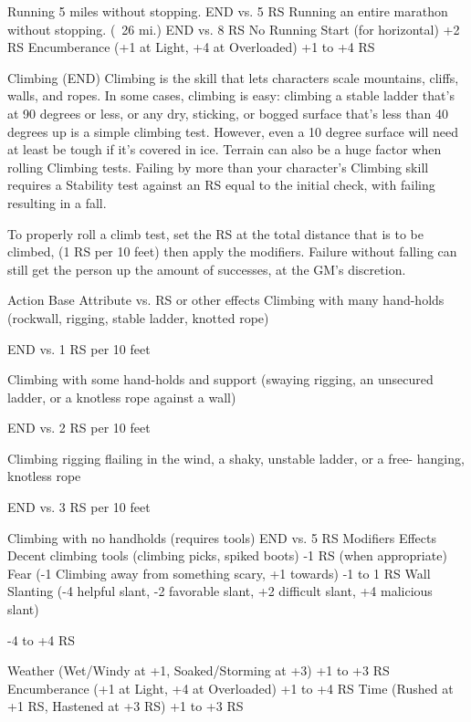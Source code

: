 \documentclass[oneside,11pt,english]{book}
\begin{document}
Running 5 miles without stopping. END vs. 5 RS 
Running an entire marathon without stopping. (~26 mi.) END vs. 8 RS 
No Running Start (for horizontal) +2 RS 
Encumberance (+1 at Light, +4 at Overloaded) +1 to +4 RS 

 

 

Climbing (END) 
Climbing is the skill that lets characters scale mountains, cliffs, walls, and ropes. In some cases, climbing 
is easy: climbing a stable ladder that’s at 90 degrees or less, or any dry, sticking, or bogged surface that’s 
less than 40 degrees up is a simple climbing test. However, even a 10 degree surface will need at least be 
tough if it’s covered in ice. Terrain can also be a huge factor when rolling Climbing tests. Failing by more 
than your character’s Climbing skill requires a Stability test against an RS equal to the initial check, with 
failing resulting in a fall. 

 

To properly roll a climb test, set the RS at the total distance that is to be climbed, (1 RS per 10 feet) then 
apply the modifiers. Failure without falling can still get the person up the amount of successes, at the 
GM’s discretion. 

 

Action Base Attribute vs. RS or 
other effects 
Climbing with many hand-holds (rockwall, rigging, stable ladder, knotted 
rope) 

END vs. 1 RS per 10 feet 

Climbing with some hand-holds and support (swaying rigging, an 
unsecured ladder, or a knotless rope against a wall) 

END vs. 2 RS per 10 feet 

Climbing rigging flailing in the wind, a shaky, unstable ladder, or a free-
hanging, knotless rope 

END vs. 3 RS per 10 feet 

Climbing with no handholds (requires tools) END vs. 5 RS 
Modifiers Effects 
Decent climbing tools (climbing picks, spiked boots) -1 RS (when appropriate) 
Fear (-1 Climbing away from something scary, +1 towards) -1 to 1 RS 
Wall Slanting (-4 helpful slant, -2 favorable slant, +2 difficult slant, +4 
malicious slant) 

-4 to +4 RS 

Weather (Wet/Windy at +1, Soaked/Storming at +3) +1 to +3 RS 
Encumberance (+1 at Light, +4 at Overloaded) +1 to +4 RS 
Time (Rushed at +1 RS, Hastened at +3 RS) +1 to +3 RS 
\end{document}
